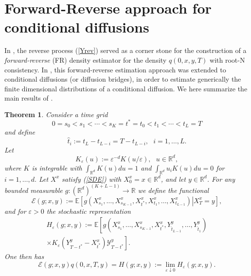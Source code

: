 \documentclass[a4paper,11pt]{amsart}
\theoremstyle{plain}
\newtheorem{theorem}{Theorem}
\theoremstyle{remark}
\begin{document}
\section{Forward-Reverse approach for conditional diffusions}

\label{RecapFR}

In \cite{MSS2004}, the reverse process (\ref{Yrev}) served as a corner stone
for the construction of a \emph{forward-reverse }(FR) density estimator for
the density $q(0,x,y,T)$ with root-N consistency. In \cite{BS2014}, this
forward-reverse estimation approach was extended to conditional diffusions (or
diffusion bridges), in order to estimate generically the finite dimensional
distributions of a conditional diffusion. We here summarize the main results
of \cite{BS2014}.  

\begin{theorem}
\cite[Thm. 3.4]{BS2014} Consider a time grid%
\[
0=s_{0}<s_{1}<\cdots<s_{K}=t^{\ast}=t_{0}<t_{1}<\cdots<t_{L}=T
\]
and define%
\[
\widehat{t}_{i}:=t_{L}-t_{L-i}=T-t_{L-i},\text{ \ \ }i=1,\ldots,L.
\]
Let%
\[
K_{\varepsilon}(u):=\varepsilon^{-d}K(u/\varepsilon),\text{ \ \ }%
u\in\mathbb{R}^{d},
\]
where $K$ is integrable with $\int_{\mathbb{R}^{d}}K(u)du=1$ 
and   $\int_{\mathbb{R}^{d}}u_iK(u)du=0$ for $i=1,\ldots,d.$
Let $X^{x}$
satisfy (\ref{SDE}) with $X_{0}^{x}=x\in\mathbb{R}^{d}$, and let
$y\in\mathbb{R}^{d}$. For any bounded measurable $g:\left(  \mathbb{R}%
^{d}\right)  ^{(K+L-1)}\rightarrow\mathbb{R}$ we define the functional%
\[
\mathcal{E}(g;x,y):=\mathbb{E}\left[  \left.  g\left(  X_{s_{1}}^{x}%
,\ldots,X_{s_{K-1}}^{x},X_{t^{\ast}}^{x},X_{t_{1}}^{x},\ldots,X_{t_{L-1}}%
^{x}\right)  \right\vert X_{T}^{x}=y\right]  ,
\]
and for $\varepsilon>0$ the stochastic representation%
\begin{multline}
H_{\varepsilon}(g;x,y):=\mathbb{E}\left[  g\left(  X_{s_{1}}^{x}%
,\ldots,X_{s_{K-1}}^{x},X_{t^{\ast}}^{x},Y_{\widehat{t}_{L-1}}^{y}%
,\ldots,Y_{\widehat{t}_{1}}^{y}\right)  \right. \label{heps}\\
\left.  \times K_{\varepsilon}(Y_{T-t^{\ast}}^{y}-X_{t^{\ast}}^{x}%
)\mathcal{Y}_{T-t^{\ast}}^{y}\right]  .
\end{multline}
One then has%
\begin{equation}
\mathcal{E}(g;x,y)q(0,x,T,y)=H(g;x,y):=\lim_{\varepsilon\downarrow
0}H_{\varepsilon}(g;x,y). \label{FRrep}%
\end{equation}

\end{theorem}
\end{document}
